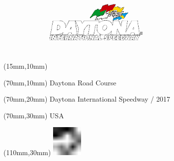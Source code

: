 \null\newpage
\begin{textblock*}{50mm}(15mm,10mm)%
\includegraphics[width=50mm]{LG/DAY.png}
\end{textblock*}
\begin{textblock*}{130mm}(70mm,10mm)%
{\fontsize{20}{20}\selectfont Daytona Road Course}\\
\end{textblock*}
\begin{textblock*}{120mm}(70mm,20mm)%
{\fontsize{16}{16}\selectfont Daytona International Speedway / 2017}\\
\end{textblock*}
\begin{textblock*}{120mm}(70mm,30mm)%
{\fontsize{12}{12}\selectfont USA}
\end{textblock*}
\begin{textblock*}{30mm}(110mm,30mm)%
\centering
\includegraphics[height=15mm]{icons/fa-rotate-left.pdf}
\end{textblock*}
